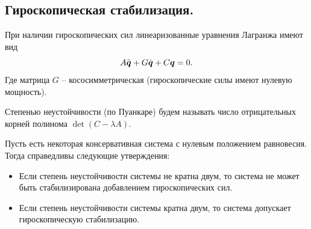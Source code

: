 \subsection{Гироскопическая стабилизация.}
При наличии гироскопических сил линеаризованные уравнения Лагранжа имеют вид
\[
    A\ddot{\boldsymbol{q}} + G\dot{\boldsymbol{q}} +C\boldsymbol{q} = 0.
\]
Где матрица $G$ -- кососимметрическая (гироскопические силы имеют нулевую мощность).
\begin{definition}
    Степенью неустойчивости (по Пуанкаре) будем называть число отрицательных корней полинома $\det (C - \lambda A)$.
\end{definition}
\begin{theorem}
    Пусть есть некоторая консервативная система с нулевым положением равновесия.
    Тогда справедливы следующие утверждения:
    \begin{itemize}
        \item Если степень неустойчивости системы не кратна двум, то система не может быть стабилизирована добавлением гироскопических сил.
        \item Если степень неустойчивости системы кратна двум, то система допускает гироскопическую стабилизацию.
    \end{itemize}
\end{theorem}
